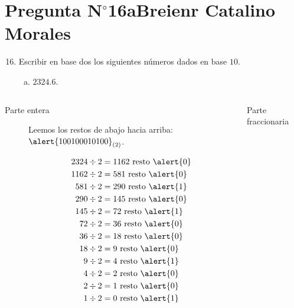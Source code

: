 \section{Pregunta N$^{\circ}$16a\qquad Breienr Catalino Morales}

\begin{frame}
	\begin{enumerate}\setcounter{enumi}{15}
		\item

		      Escribir en base dos los siguientes números dados en
		      base $10$.

		      \begin{enumerate}[a)]
			      \item

			            \begin{math}
				            2324.6
			            \end{math}.
		      \end{enumerate}
	\end{enumerate}

	\begin{solution}
		\begin{columns}[t]
			\begin{column}{0.48\textwidth}
				\begin{description}
					\item[Parte entera]
						Leemos los restos de abajo hacia arriba:
						${\alert{100100010100}}_{\left(2\right)}$.

						\begin{align*}
							2324 \div 2 & = 1162 \text{ resto }\alert{0} \\
							1162 \div 2 & = 581 \text{ resto }\alert{0}  \\
							581 \div 2  & = 290 \text{ resto }\alert{1}  \\
							290 \div 2  & = 145 \text{ resto }\alert{0}  \\
							145 \div 2  & = 72 \text{ resto }\alert{1}   \\
							72 \div 2   & = 36 \text{ resto }\alert{0}   \\
							36 \div 2   & = 18 \text{ resto }\alert{0}   \\
							18 \div 2   & = 9 \text{ resto }\alert{0}    \\
							9 \div 2    & = 4 \text{ resto }\alert{1}    \\
							4 \div 2    & = 2 \text{ resto }\alert{0}    \\
							2 \div 2    & = 1 \text{ resto }\alert{0}    \\
							1 \div 2    & = 0 \text{ resto }\alert{1}    \\
						\end{align*}
				\end{description}
			\end{column}
			\begin{column}{0.48\textwidth}
				\begin{description}
					\item[Parte fraccionaria]


\end{description}
\end{column}
\end{columns}
\end{solution}
\end{frame}
